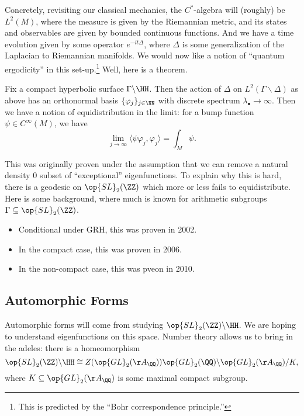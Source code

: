 \documentclass{article}
\begin{document}
Concretely, revisiting our classical mechanics, the $C^*$-algebra will (roughly) be $L^2(M)$, where the measure is given by the Riemannian metric, and its states and observables are given by bounded continuous functions. And we have a time evolution given by some operator $e^{-it\Delta}$, where $\Delta$ is some generalization of the Laplacian to Riemannian manifolds. We would now like a notion of ``quantum ergodicity'' in this set-up.\footnote{This is predicted by the ``Bohr correspondence principle.''} Well, here is a theorem.
\begin{theorem} \label{thm:quantum-chaos}
	Fix a compact hyperbolic surface $\Gamma\backslash\HH$. Then the action of $\Delta$ on $L^2(\Gamma\backslash\Delta)$ as above has an orthonormal basis $\{\varphi_j\}_{j\in\NN}$ with discrete spectrum $\lambda_\bullet\to\infty$. Then we have a notion of equidistribution in the limit: for a bump function $\psi\in C^\infty(M)$, we have
	\[\lim_{j\to\infty}\langle\psi\varphi_j,\varphi_j\rangle=\int_M\psi.\]
\end{theorem}
This was originally proven under the assumption that we can remove a natural density $0$ subset of ``exceptional'' eigenfunctions. To explain why this is hard, there is a geodesic on $\op{SL}_2(\ZZ)$ which more or less fails to equidistribute. %
Here is some background, where much is known for arithmetic subgroups $\Gamma\subseteq\op{SL}_2(\ZZ)$.
\begin{itemize}
	\item Conditional under GRH, this was proven in 2002.
	\item In the compact case, this was proven in 2006.
	\item In the non-compact case, this was pveon in 2010.
\end{itemize}

\subsection{Automorphic Forms}
Automorphic forms will come from studying $\op{SL}_2(\ZZ)\backslash\HH$. We are hoping to understand eigenfunctions on this space. Number theory allows us to bring in the adeles: there is a homeomorphism
\[\op{SL}_2(\ZZ)\backslash\HH\cong Z(\op{GL}_2(\AA_\QQ))\op{GL}_2(\QQ)\backslash\op{GL}_2(\AA_\QQ)/K,\]
where $K\subseteq\op{GL}_2(\AA_\QQ)$ is some maximal compact subgroup.
\end{document}

